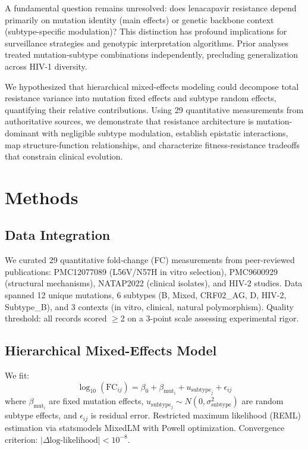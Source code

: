 \documentclass[twocolumn]{article}
\begin{document}
A fundamental question remains unresolved: does lenacapavir resistance depend primarily on mutation identity (main effects) or genetic backbone context (subtype-specific modulation)? This distinction has profound implications for surveillance strategies and genotypic interpretation algorithms. Prior analyses treated mutation-subtype combinations independently\cite{Andreatta2024}, precluding generalization across HIV-1 diversity.

We hypothesized that hierarchical mixed-effects modeling could decompose total resistance variance into mutation fixed effects and subtype random effects, quantifying their relative contributions. Using 29 quantitative measurements from authoritative sources, we demonstrate that resistance architecture is mutation-dominant with negligible subtype modulation, establish epistatic interactions, map structure-function relationships, and characterize fitness-resistance tradeoffs that constrain clinical evolution.

\section{Methods}

\subsection{Data Integration}
We curated 29 quantitative fold-change (FC) measurements from peer-reviewed publications: PMC12077089 (L56V/N57H in vitro selection)\cite{Andreatta2024}, PMC9600929 (structural mechanisms)\cite{Yant2022}, NATAP2022 (clinical isolates), and HIV-2 studies. Data spanned 12 unique mutations, 6 subtypes (B, Mixed, CRF02\_AG, D, HIV-2, Subtype\_B), and 3 contexts (in vitro, clinical, natural polymorphism). Quality threshold: all records scored $\geq$2 on a 3-point scale assessing experimental rigor.

\subsection{Hierarchical Mixed-Effects Model}
We fit:
\begin{equation}
\log_{10}(\text{FC}_{ij}) = \beta_0 + \beta_{\text{mut}_i} + u_{\text{subtype}_j} + \epsilon_{ij}
\end{equation}
where $\beta_{\text{mut}_i}$ are fixed mutation effects, $u_{\text{subtype}_j} \sim N(0, \sigma^2_{\text{subtype}})$ are random subtype effects, and $\epsilon_{ij}$ is residual error. Restricted maximum likelihood (REML) estimation via statsmodels MixedLM with Powell optimization. Convergence criterion: $|\Delta\text{log-likelihood}| < 10^{-8}$.
\end{document}
